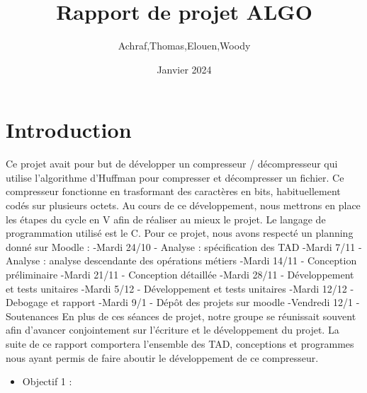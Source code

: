 \documentclass{article}
\begin{document}
\title{Rapport de projet ALGO}

{\centering
\author{Achraf,Thomas,Elouen,Woody}
\par}
\date{Janvier 2024}
\maketitle


\thispagestyle{empty}

\newpage

\tableofcontents

\newpage

\maketitle

\section{\textbf{Introduction}}
 Ce projet avait pour but de développer un compresseur / décompresseur qui utilise l'algorithme d'Huffman pour compresser et décompresser un fichier. Ce compresseur fonctionne en trasformant des caractères en bits, habituellement codés sur plusieurs octets.  Au cours de ce développement, nous mettrons en place les étapes du cycle en V afin de réaliser au mieux le projet. Le langage de programmation utilisé est le C. Pour ce projet, nous avons respecté un planning donné sur Moodle : 
-Mardi 24/10 - Analyse : spécification des TAD
-Mardi 7/11 - Analyse : analyse descendante des opérations métiers
-Mardi 14/11 - Conception préliminaire
-Mardi 21/11 - Conception détaillée
-Mardi 28/11 - Développement et tests unitaires
-Mardi 5/12 - Développement et tests unitaires
-Mardi 12/12 - Debogage et rapport
-Mardi 9/1 - Dépôt des projets sur moodle
-Vendredi 12/1 - Soutenances
En plus de ces séances de projet, notre groupe se réunissait souvent afin d'avancer conjointement sur l'écriture et le développement du projet. La suite de ce rapport comportera l'ensemble des TAD, conceptions et programmes nous ayant permis de faire aboutir le développement de ce compresseur.

\begin{itemize}[label={\textbullet}]
  \item Objectif 1 :
\end{itemize}
\end{document}

